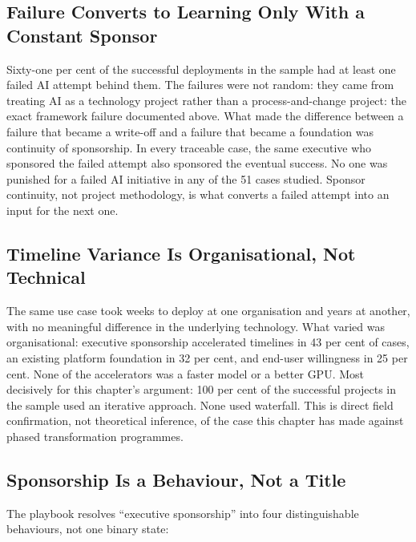 \subsection{Failure Converts to Learning Only With a Constant Sponsor}

Sixty-one per cent of the successful deployments in the sample had at least one failed AI attempt behind them. The failures were not random: they came from treating AI as a technology project rather than a process-and-change project: the exact framework failure documented above. What made the difference between a failure that became a write-off and a failure that became a foundation was continuity of sponsorship. In every traceable case, the same executive who sponsored the failed attempt also sponsored the eventual success. No one was punished for a failed AI initiative in any of the 51 cases studied. Sponsor continuity, not project methodology, is what converts a failed attempt into an input for the next one.

\subsection{Timeline Variance Is Organisational, Not Technical}

The same use case took weeks to deploy at one organisation and years at another, with no meaningful difference in the underlying technology. What varied was organisational: executive sponsorship accelerated timelines in 43 per cent of cases, an existing platform foundation in 32 per cent, and end-user willingness in 25 per cent. None of the accelerators was a faster model or a better GPU. Most decisively for this chapter's argument: 100 per cent of the successful projects in the sample used an iterative approach. None used waterfall. This is direct field confirmation, not theoretical inference, of the case this chapter has made against phased transformation programmes.

\subsection{Sponsorship Is a Behaviour, Not a Title}

The playbook resolves ``executive sponsorship'' into four distinguishable behaviours, not one binary state:

